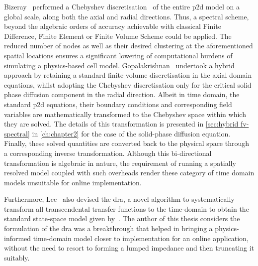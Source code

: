 Bizeray\etal{}~\cite{Bizeray2015}         performed          a         Chebyshev
discretisation~\cite{Trefethen2000}  of   the  entire   \gls{p2d}  model   on  a
global  scale,  \ie{}  along  both   the  axial  and  radial  directions.  Thus,
a  spectral  scheme,   beyond  the  algebraic  orders   of  accuracy  achievable
with  classical  Finite  Difference,  Finite Element  or  Finite  Volume  Scheme
could  be  applied.  The reduced  number  of  nodes  as  well as  their  desired
clustering  at  the  aforementioned  spatial  locations  ensures  a  significant
lowering  of computational  burdens of  simulating a  physics-based cell  model.
Gopalakrishnan\etal{}~\cite{Gopalakrishnan2018} undertook  a hybrid  approach by
retaining a standard finite volume discretisation in the axial domain equations,
whilst adopting the  Chebyshev discretisation only for the  critical solid phase
diffusion component in the radial direction. Albeit in time domain, the standard
\gls{p2d} equations, their boundary conditions and corresponding field variables
are  mathematically transformed  to the  Chebyshev space  within which  they are
solved.  The details  of this  transformation is  presented in  \cref{sec:hybrid
fv-spectral} in  \cref{ch:chapter2} for  the case  of the  solid-phase diffusion
equation.  Finally,   these  solved  quantities   are  converted  back   to  the
physical  space through  a corresponding  inverse transformation.  Although this
bi-directional transformation is algebraic in nature, the requirement of running
a spatially resolved model coupled with  such overheads render these category of
time domain models unsuitable for online implementation.



Furthermore,  Lee~\etal{}   also  devised  the  \gls{dra},   a  novel  algorithm
to  systematically  transform  all  transcendental  transfer  functions  to  the
time-domain to  obtain the standard state-space  model given by~\cite{Lee2012a}.
The  author of  this thesis  considers the  formulation of  the \gls{dra}  was a
breakthrough that helped in bringing a physics-informed time-domain model closer
to  implementation for  an online  application, without  the need  to resort  to
forming a lumped impedance and then truncating it suitably.


